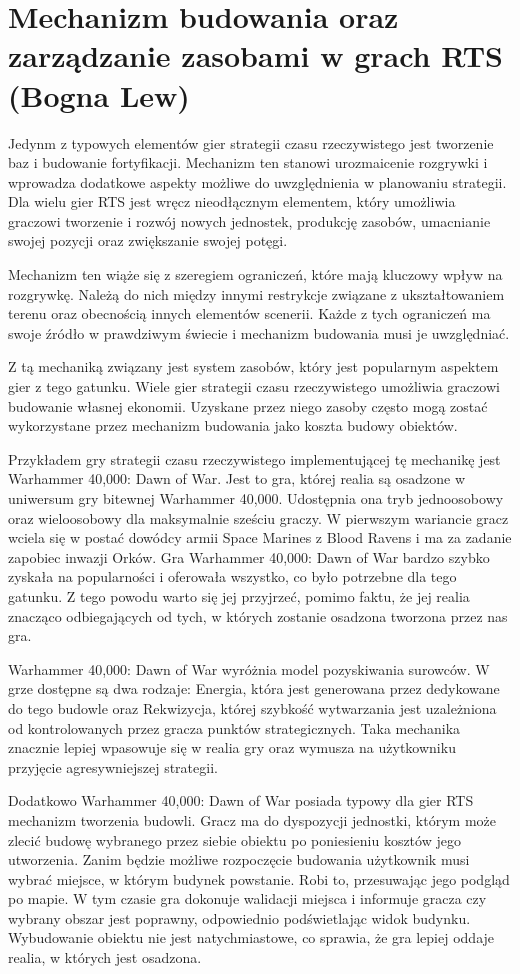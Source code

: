 \section{Mechanizm budowania oraz zarządzanie zasobami w grach RTS (Bogna Lew)}\label{s:budowanie}
Jedynm z typowych elementów gier strategii czasu rzeczywistego  jest tworzenie baz i budowanie fortyfikacji. Mechanizm
ten stanowi urozmaicenie rozgrywki i wprowadza dodatkowe aspekty możliwe do uwzględnienia w planowaniu strategii. Dla
wielu gier RTS jest wręcz nieodłącznym elementem, który umożliwia graczowi tworzenie i rozwój nowych jednostek,
produkcję zasobów, umacnianie swojej pozycji oraz zwiększanie swojej potęgi.

Mechanizm ten wiąże się z szeregiem ograniczeń, które mają kluczowy wpływ na rozgrywkę. Należą do nich między innymi
restrykcje związane z ukształtowaniem terenu oraz obecnością innych elementów scenerii. Każde z tych ograniczeń ma
swoje źródło w prawdziwym świecie i mechanizm budowania musi je uwzględniać.

Z tą mechaniką związany jest system zasobów, który jest popularnym aspektem gier z tego gatunku. Wiele gier strategii
czasu rzeczywistego umożliwia graczowi budowanie własnej ekonomii. Uzyskane przez niego zasoby często mogą zostać
wykorzystane przez mechanizm budowania jako koszta budowy obiektów.

Przykładem gry strategii czasu rzeczywistego implementującej tę mechanikę jest Warhammer 40,000: Dawn of War. Jest to
gra, której realia są osadzone w uniwersum gry bitewnej Warhammer 40,000. Udostępnia ona tryb jednoosobowy oraz
wieloosobowy dla maksymalnie sześciu graczy. W pierwszym wariancie gracz wciela się w postać dowódcy
armii Space Marines z Blood Ravens i ma za zadanie zapobiec inwazji Orków. Gra Warhammer 40,000: Dawn of War bardzo szybko
zyskała na popularności i oferowała wszystko, co było potrzebne dla tego gatunku. Z tego powodu warto się jej przyjrzeć,
pomimo faktu, że jej realia znacząco odbiegających od tych, w których zostanie osadzona tworzona przez nas gra.

Warhammer 40,000: Dawn of War wyróżnia model pozyskiwania surowców. W grze dostępne są dwa rodzaje: Energia, która jest
generowana przez dedykowane do tego budowle oraz Rekwizycja, której szybkość wytwarzania jest uzależniona od kontrolowanych
przez gracza punktów strategicznych. Taka mechanika znacznie lepiej wpasowuje się w realia gry oraz wymusza na użytkowniku
przyjęcie agresywniejszej strategii.

Dodatkowo Warhammer 40,000: Dawn of War posiada typowy dla gier RTS mechanizm tworzenia budowli. Gracz ma
do dyspozycji jednostki, którym może zlecić budowę wybranego przez siebie obiektu po poniesieniu kosztów jego utworzenia.
Zanim będzie możliwe rozpoczęcie budowania użytkownik musi wybrać miejsce, w którym budynek powstanie. Robi to, przesuwając
jego podgląd po mapie. W tym czasie gra dokonuje walidacji miejsca i informuje gracza czy wybrany obszar jest poprawny,
odpowiednio podświetlając widok budynku. Wybudowanie obiektu nie jest natychmiastowe, co sprawia, że gra lepiej oddaje
realia, w których jest osadzona.

